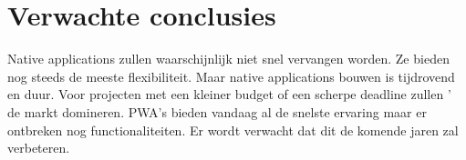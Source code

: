 \section{Verwachte conclusies}
\label{sec:verwachte_conclusies}

Native applications zullen waarschijnlijk niet snel vervangen worden. Ze bieden nog steeds de meeste flexibiliteit. Maar native applications bouwen is tijdrovend en duur. 
Voor projecten met een kleiner budget of een scherpe deadline zullen ' de markt domineren.
PWA's bieden vandaag al de snelste ervaring maar er ontbreken nog functionaliteiten. Er wordt verwacht dat dit de komende jaren zal verbeteren.




